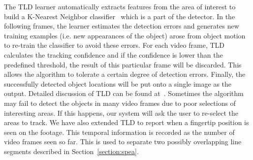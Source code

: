         The TLD learner automatically extracts features from the area of interest to build a K-Nearest Neighbor
        classifier~\cite{hastie1996discriminant}
        which is a part of the detector. In the following frames, the learner
        estimates the detection errors and generates new training
        examples (i.e. new appearances of the object) arose from object motion to
        re-train the classifier to avoid these errors. For each video frame,
        TLD calculates the tracking confidence and if the confidence is lower than the predefined threshold, the result of
        this particular frame will be discarded. This allows the algorithm to
        tolerate a certain degree of detection errors. Finally, the
        successfully detected object locations will be put onto a single
        image as the output. Detailed discussion of TLD can be found
        at~\cite{kalal2012tracking}.
        Sometimes the algorithm may fail to detect the objects in many video frames due to poor selections of interesting areas. If this happens, our system will ask the user to re-select the areas to track.
        We have also extended TLD to report when a
        fingertip position is seen on the footage. This temporal information is recorded as the number
        of video frames seen so far. This
         is used to separate two possibly overlapping line segments described in Section~\ref{section:spea}.

